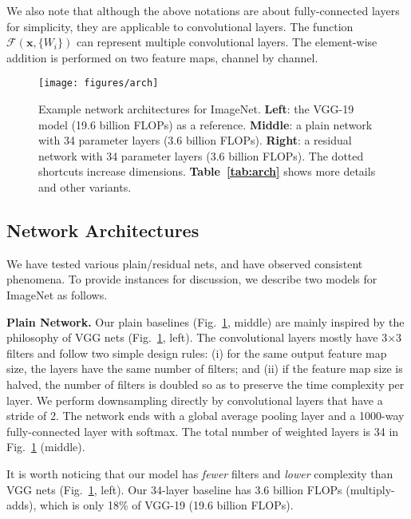 \documentclass{article}
\newcommand{\ve}[1]{\mathbf{#1}} %
\begin{document}
We also note that although the above notations are about fully-connected layers for simplicity, they are applicable to convolutional layers. The function $\mathcal{F}(\ve{x}, \{W_{i}\})$ can represent multiple convolutional layers. The element-wise addition is performed on two feature maps, channel by channel.

\begin{figure}[t]
\begin{center}
\vspace{.5em}
\texttt{[image: figures/arch]}
\end{center}
\caption{Example network architectures for ImageNet. \textbf{Left}: the VGG-19 model \cite{Simonyan2015} (19.6 billion FLOPs) as a reference. \textbf{Middle}: a plain network with 34 parameter layers (3.6 billion FLOPs). \textbf{Right}: a residual network with 34 parameter layers (3.6 billion FLOPs). The dotted shortcuts increase dimensions. \textbf{Table~\ref{tab:arch}} shows more details and other variants.}
\label{fig:arch}
\vspace{-1em}
\end{figure}

\subsection{Network Architectures}

We have tested various plain/residual nets, and have observed consistent phenomena. To provide instances for discussion, we describe two models for ImageNet as follows.

\vspace{6pt}
\noindent\textbf{Plain Network.}
Our plain baselines (Fig.~\ref{fig:arch}, middle) are mainly inspired by the philosophy of VGG nets \cite{Simonyan2015} (Fig.~\ref{fig:arch}, left).
The convolutional layers mostly have 3$\times$3 filters and follow two simple design rules: (i) for the same output feature map size, the layers have the same number of filters; and (ii) if the feature map size is halved, the number of filters is doubled so as to preserve the time complexity per layer. We perform downsampling directly by convolutional layers that have a stride of 2.
The network ends with a global average pooling layer and a 1000-way fully-connected layer with softmax. The total number of weighted layers is 34 in Fig.~\ref{fig:arch} (middle).

It is worth noticing that our model has \emph{fewer} filters and \emph{lower} complexity than VGG nets \cite{Simonyan2015} (Fig.~\ref{fig:arch}, left). Our 34-layer baseline has 3.6 billion FLOPs (multiply-adds), which is only 18\% of VGG-19 (19.6 billion FLOPs).
\end{document}
